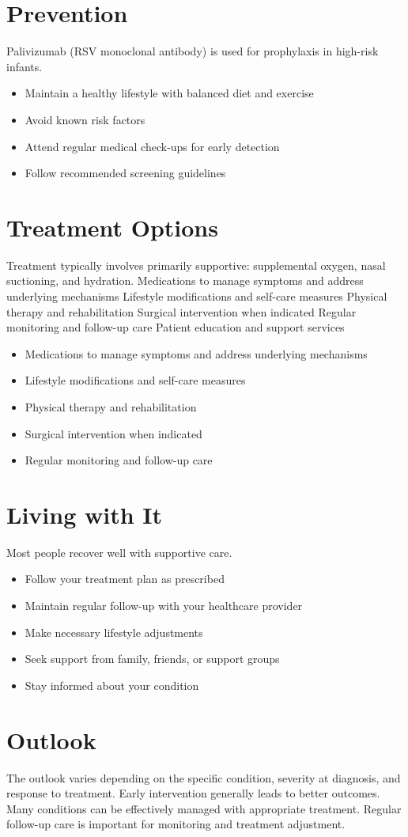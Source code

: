 \section{Prevention}
Palivizumab (RSV monoclonal antibody) is used for prophylaxis in high-risk infants.

\begin{itemize}[noitemsep]
  \item Maintain a healthy lifestyle with balanced diet and exercise
  \item Avoid known risk factors
  \item Attend regular medical check-ups for early detection
  \item Follow recommended screening guidelines
\end{itemize}
\section{Treatment Options}
Treatment typically involves primarily supportive: supplemental oxygen, nasal suctioning, and hydration. Medications to manage symptoms and address underlying mechanisms Lifestyle modifications and self-care measures Physical therapy and rehabilitation Surgical intervention when indicated Regular monitoring and follow-up care Patient education and support services

\begin{itemize}[noitemsep]
  \item Medications to manage symptoms and address underlying mechanisms
  \item Lifestyle modifications and self-care measures
  \item Physical therapy and rehabilitation
  \item Surgical intervention when indicated
  \item Regular monitoring and follow-up care
\end{itemize}
\section{Living with It}
Most people recover well with supportive care.

\begin{itemize}[noitemsep]
  \item Follow your treatment plan as prescribed
  \item Maintain regular follow-up with your healthcare provider
  \item Make necessary lifestyle adjustments
  \item Seek support from family, friends, or support groups
  \item Stay informed about your condition
\end{itemize}
\section{Outlook}
The outlook varies depending on the specific condition, severity at diagnosis, and response to treatment. Early intervention generally leads to better outcomes. Many conditions can be effectively managed with appropriate treatment. Regular follow-up care is important for monitoring and treatment adjustment.
